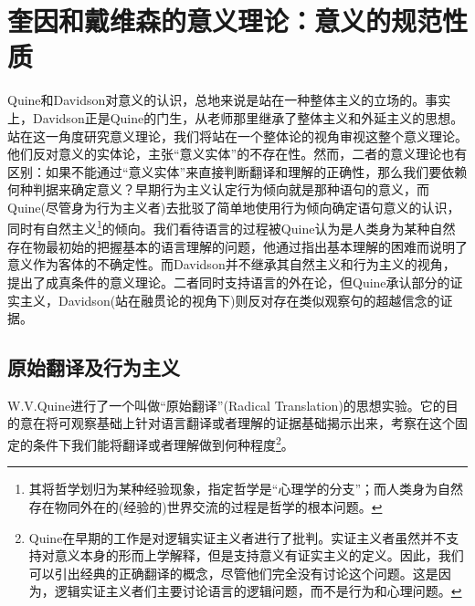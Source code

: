 \documentclass{article}
\begin{document}
\section{奎因和戴维森的意义理论：意义的规范性质}
Quine和Davidson对意义的认识，总地来说是站在一种整体主义的立场的。事实上，Davidson正是Quine的门生，从老师那里继承了整体主义和外延主义的思想。站在这一角度研究意义理论，我们将站在一个整体论的视角审视这整个意义理论。他们反对意义的实体论，主张“意义实体”的不存在性。然而，二者的意义理论也有区别：如果不能通过“意义实体”来直接判断翻译和理解的正确性，那么我们要依赖何种判据来确定意义？早期行为主义认定行为倾向就是那种语句的意义，而Quine(尽管身为行为主义者)去批驳了简单地使用行为倾向确定语句意义的认识，同时有自然主义\footnote{其将哲学划归为某种经验现象，指定哲学是“心理学的分支”；而人类身为自然存在物同外在的(经验的)世界交流的过程是哲学的根本问题。}的倾向。我们看待语言的过程被Quine认为是人类身为某种自然存在物最初始的把握基本的语言理解的问题，他通过指出基本理解的困难而说明了意义作为客体的不确定性。而Davidson并不继承其自然主义和行为主义的视角，提出了成真条件的意义理论。二者同时支持语言的外在论，但Quine承认部分的证实主义，Davidson(站在融贯论的视角下)则反对存在类似观察句的超越信念的证据。
\subsection{原始翻译及行为主义}
W.V.Quine进行了一个叫做“原始翻译”(Radical Translation)的思想实验。它的目的意在将可观察基础上针对语言翻译或者理解的证据基础揭示出来，考察在这个固定的条件下我们能将翻译或者理解做到何种程度\footnote{Quine在早期的工作是对逻辑实证主义者进行了批判。实证主义者虽然并不支持对意义本身的形而上学解释，但是支持意义有证实主义的定义。因此，我们可以引出经典的正确翻译的概念，尽管他们完全没有讨论这个问题。这是因为，逻辑实证主义者们主要讨论语言的逻辑问题，而不是行为和心理问题。}。
\end{document}
